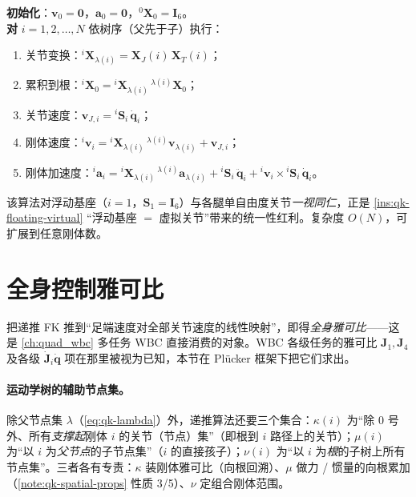 \begin{algo}\label{alg:qk-recursive-fk}
\textbf{初始化}：$\boldsymbol{v}_0=\mathbf{0}$，$\boldsymbol{a}_0=\mathbf{0}$，${}^{0}\mathbf{X}_0=\mathbf{I}_6$。\\
\textbf{对} $i=1,2,\dots,N$ 依树序（父先于子）执行：
\begin{enumerate}
  \item 关节变换：${}^{i}\mathbf{X}_{\lambda(i)}=\mathbf{X}_J(i)\,\mathbf{X}_T(i)$；
  \item 累积到根：${}^{i}\mathbf{X}_0={}^{i}\mathbf{X}_{\lambda(i)}\,{}^{\lambda(i)}\mathbf{X}_0$；
  \item 关节速度：$\boldsymbol{v}_{J,i}={}^{i}\mathbf{S}_i\,\dot{\boldsymbol{q}}_i$；
  \item 刚体速度：${}^{i}\boldsymbol{v}_i={}^{i}\mathbf{X}_{\lambda(i)}\,{}^{\lambda(i)}\boldsymbol{v}_{\lambda(i)}+\boldsymbol{v}_{J,i}$；
  \item 刚体加速度：${}^{i}\boldsymbol{a}_i={}^{i}\mathbf{X}_{\lambda(i)}\,{}^{\lambda(i)}\boldsymbol{a}_{\lambda(i)}+{}^{i}\mathbf{S}_i\,\ddot{\boldsymbol{q}}_i+{}^{i}\boldsymbol{v}_i\times{}^{i}\mathbf{S}_i\,\dot{\boldsymbol{q}}_i$。
\end{enumerate}
\end{algo}

\noindent{}该算法对浮动基座（$i=1$，$\mathbf{S}_1=\mathbf{I}_6$）与各腿单自由度关节\emph{一视同仁}，正是 \cref{ins:qk-floating-virtual} “浮动基座 $=$ 虚拟关节”带来的统一性红利。复杂度 $O(N)$，可扩展到任意刚体数。

\section{全身控制雅可比}
\label{sec:qk-wbjac}

把递推 FK 推到“足端速度对全部关节速度的线性映射”，即得\emph{全身雅可比}——这是 \cref{ch:quad_wbc} 多任务 WBC 直接消费的对象。WBC 各级任务的雅可比 $\mathbf{J}_1,\mathbf{J}_4$ 及各级 $\dot{\mathbf{J}}_i\dot{\boldsymbol{q}}$ 项在那里被视为已知，本节在 Plücker 框架下把它们求出\cite{yu2021quadruped}。

\paragraph{运动学树的辅助节点集。}
除父节点集 $\lambda$（\cref{eq:qk-lambda}）外，递推算法还要三个集合\cite{yu2021quadruped}：$\kappa(i)$ 为“除 $0$ 号外、所有\emph{支撑起}刚体 $i$ 的关节（节点）集”（即根到 $i$ 路径上的关节）；$\mu(i)$ 为“以 $i$ 为\emph{父节点}的子节点集”（$i$ 的直接孩子）；$\nu(i)$ 为“以 $i$ 为\emph{根}的子树上所有节点集”。三者各有专责：$\kappa$ 装刚体雅可比（向根回溯）、$\mu$ 做力 / 惯量的向根累加（\cref{note:qk-spatial-props} 性质 3/5）、$\nu$ 定组合刚体范围。

